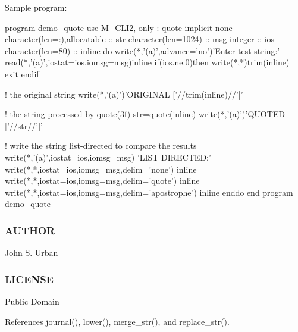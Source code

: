 Sample program\+: \begin{DoxyVerb}program demo_quote
use M_CLI2, only : quote
implicit none
character(len=:),allocatable :: str
character(len=1024)          :: msg
integer                      :: ios
character(len=80)            :: inline
   do
      write(*,'(a)',advance='no')'Enter test string:'
      read(*,'(a)',iostat=ios,iomsg=msg)inline
      if(ios.ne.0)then
         write(*,*)trim(inline)
         exit
      endif

      ! the original string
      write(*,'(a)')'ORIGINAL     ['//trim(inline)//']'

      ! the string processed by quote(3f)
      str=quote(inline)
      write(*,'(a)')'QUOTED     ['//str//']'

      ! write the string list-directed to compare the results
      write(*,'(a)',iostat=ios,iomsg=msg) 'LIST DIRECTED:'
      write(*,*,iostat=ios,iomsg=msg,delim='none') inline
      write(*,*,iostat=ios,iomsg=msg,delim='quote') inline
      write(*,*,iostat=ios,iomsg=msg,delim='apostrophe') inline
   enddo
end program demo_quote
\end{DoxyVerb}


\subsubsection*{A\+U\+T\+H\+OR}

John S. Urban \subsubsection*{L\+I\+C\+E\+N\+SE}

Public Domain 

References journal(), lower(), merge\+\_\+str(), and replace\+\_\+str().

